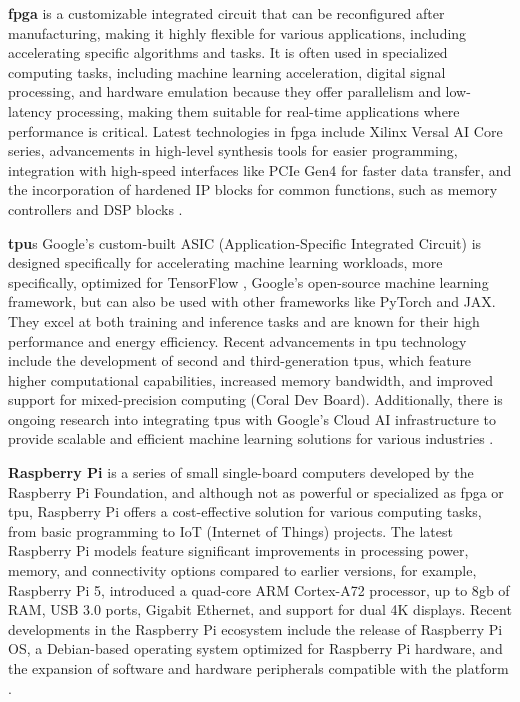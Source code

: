 \textbf{\gls{fpga}} is a customizable integrated circuit that can be reconfigured after manufacturing, making it highly flexible for various applications, including accelerating specific algorithms and tasks. It is often used in specialized computing tasks, including machine learning acceleration, digital signal processing, and hardware emulation because they offer parallelism and low-latency processing, making them suitable for real-time applications where performance is critical. Latest technologies in \gls{fpga} include Xilinx Versal AI Core series, advancements in high-level synthesis tools for easier programming, integration with high-speed interfaces like PCIe Gen4 for faster data transfer, and the incorporation of hardened IP blocks for common functions, such as memory controllers and DSP blocks \cite{IntelFPGA2024}.

\textbf{\gls{tpu}}s Google's custom-built ASIC (Application-Specific Integrated Circuit) is designed specifically for accelerating machine learning workloads, more specifically, optimized for TensorFlow \cite{TensorFl23}, Google's open-source machine learning framework, but can also be used with other frameworks like PyTorch and JAX. They excel at both training and inference tasks and are known for their high performance and energy efficiency. Recent advancements in \gls{tpu} technology include the development of second and third-generation \gls{tpu}s, which feature higher computational capabilities, increased memory bandwidth, and improved support for mixed-precision computing (Coral Dev Board). Additionally, there is ongoing research into integrating \gls{tpu}s with Google's Cloud AI infrastructure to provide scalable and efficient machine learning solutions for various industries \cite{GoogleTPU2024}.

\textbf{Raspberry Pi} is a series of small single-board computers developed by the Raspberry Pi Foundation, and although not as powerful or specialized as \gls{fpga} or \gls{tpu}, Raspberry Pi offers a cost-effective solution for various computing tasks, from basic programming to IoT (Internet of Things) projects. The latest Raspberry Pi models feature significant improvements in processing power, memory, and connectivity options compared to earlier versions, for example, Raspberry Pi 5, introduced a quad-core ARM Cortex-A72 processor, up to 8\gls{g}\gls{b} of RAM, USB 3.0 ports, Gigabit Ethernet, and support for dual 4K displays.
Recent developments in the Raspberry Pi ecosystem include the release of Raspberry Pi OS, a Debian-based operating system optimized for Raspberry Pi hardware, and the expansion of software and hardware peripherals compatible with the platform \cite{Raspberry2023}.



